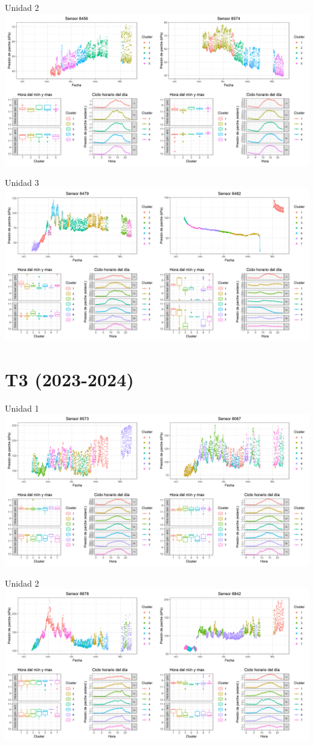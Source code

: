\documentclass[
  letterpaper,
  DIV=11,
  numbers=noendperiod]{scrreprt}
\begin{document}
Unidad 2
\includegraphics{figuras/01_turgor_sensor/2023_2024_La_Esperanza_T2_Unidad_2.png}

Unidad 3
\includegraphics{figuras/01_turgor_sensor/2023_2024_La_Esperanza_T2_Unidad_3.png}

\chapter{T3 (2023-2024)}

Unidad 1
\includegraphics{figuras/01_turgor_sensor/2023_2024_La_Esperanza_T3_Unidad_1.png}

Unidad 2
\includegraphics{figuras/01_turgor_sensor/2023_2024_La_Esperanza_T3_Unidad_2.png}
\end{document}
